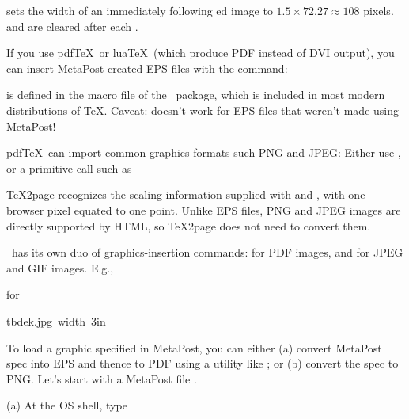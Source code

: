 {{{{{{{{{{{{{{\p{
\epsfxsize=1.5in
}

\n  sets the width of an immediately following \p{\epsfbox}ed image to
$1.5 \times 72.27 \approx 108$
pixels.
\p{\epsfxsize} and
\p{\epsfysize} are cleared after each
\p{\epsfbox}.


If you use pdf\TeX\ or lua\TeX\ (which produce PDF
instead of DVI output), you can insert
MetaPost-created EPS files with the
\p{\convertMPtoPDF} command:


\n \p{\convertMPtoPDF} is defined in the macro file
 of the \ConTeXt\ package,
which is included in most modern distributions of \TeX.
Caveat: \p{\convertMPtoPDF} doesn’t work for EPS files
that weren’t made using MetaPost!


pdf\TeX\ can import common graphics formats
such PNG and JPEG: Either use , or a primitive call
such as


\TeX2page recognizes the scaling information supplied with \p{\pdfximage}
and ,  with one browser pixel
equated to one point.  Unlike EPS files, PNG and JPEG images are directly
supported by HTML, so \TeX2page does not need to convert them.


\XeTeX\ has its own duo of graphics-insertion commands:
\p{\XeTeXpdffile} for PDF images, and \p{\XeTeXpicfile} for
JPEG and GIF images. E.g.,

for

\centerline{\hbox{\XeTeXpicfile tbdek.jpg width 3in \relax}}

To load a graphic specified in MetaPost,
you can either (a) convert MetaPost spec into EPS and
thence to PDF using a utility like ; or (b)
convert the spec to PNG. Let’s start with a MetaPost file
.

(a) At the OS shell, type


}}}}}}}}}}}}}}
